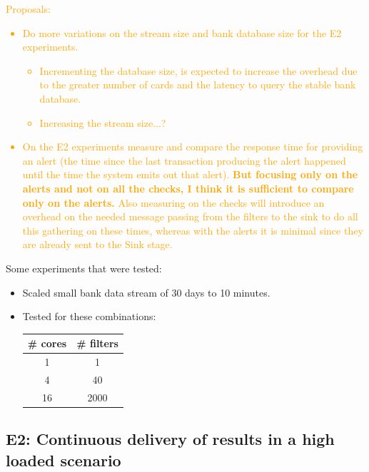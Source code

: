 \textcolor{orange}{
Proposals:
\begin{itemize}
    \item Do more variations on the stream size and bank database size for the E2 experiments.
    \begin{itemize}
        \item Incrementing the database size, is expected to increase the overhead due to the greater number of cards and the latency to query the stable bank database.
        \item Increasing the stream size...?
    \end{itemize}
    \item On the E2 experiments measure and compare the response time for providing an alert (the time since the last transaction producing the alert happened until the time the system emits out that alert). \textbf{But focusing only on the alerts and not on all the checks, I think it is sufficient to compare only on the alerts.} Also measuring on the checks will introduce an overhead on the needed message passing from the filters to the sink to do all this gathering on these times, whereas with the alerts it is minimal since they are already sent to the Sink stage.
\end{itemize}
}

Some experiments that were tested:

\begin{itemize}
    \item Scaled small bank data stream of 30 days to 10 minutes.
    \item Tested for these combinations:
    \begin{table}[H]
      \renewcommand{\arraystretch}{1.5} %
      \centering
      \begin{tabular}{|c|c|}
      \hline
      \# cores & \# filters \\ \hline
      1        & 1  \\ \hline
      4        & 40  \\ \hline
      16       & 2000  \\ \hline
      \end{tabular}
    \end{table}
\end{itemize}


\subsection{E2: Continuous delivery of results in a high loaded scenario}

